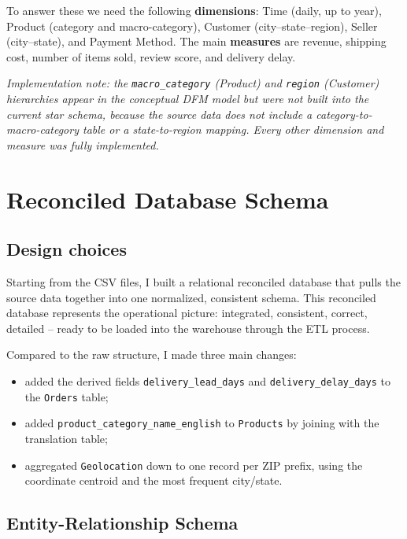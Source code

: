 \documentclass[12pt,a4paper]{article}
\begin{document}
To answer these we need the following \textbf{dimensions}: Time (daily, up to year),
Product (category and macro-category), Customer (city--state--region), Seller
(city--state), and Payment Method. The main \textbf{measures} are revenue, shipping
cost, number of items sold, review score, and delivery delay.

\textit{Implementation note: the \texttt{macro\_category} (Product) and \texttt{region}
(Customer) hierarchies appear in the conceptual DFM model but were not built into the
current star schema, because the source data does not include a
category-to-macro-category table or a state-to-region mapping. Every other dimension
and measure was fully implemented.}

\section{Reconciled Database Schema}

\subsection{Design choices}

Starting from the CSV files, I built a relational reconciled database that pulls the
source data together into one normalized, consistent schema. This reconciled database
represents the operational picture: integrated, consistent, correct, detailed -- ready
to be loaded into the warehouse through the ETL process.

Compared to the raw structure, I made three main changes:

\begin{itemize}
  \item added the derived fields \texttt{delivery\_lead\_days} and
        \texttt{delivery\_delay\_days} to the \texttt{Orders} table;
  \item added \texttt{product\_category\_name\_english} to \texttt{Products} by
        joining with the translation table;
  \item aggregated \texttt{Geolocation} down to one record per ZIP prefix, using the
        coordinate centroid and the most frequent city/state.
\end{itemize}

\subsection{Entity-Relationship Schema}
\end{document}
